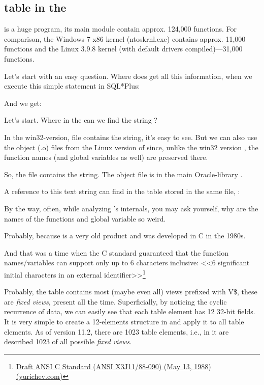 \subsection{ table in the \oracle}

\myindex{\oracle}
 is a huge program, its main module  contain approx. 124,000 functions. For comparison, the Windows 7 x86 kernel (ntoskrnl.exe) contains approx. 11,000 functions and the Linux 3.9.8 kernel
(with default drivers compiled)---31,000 functions.

Let's start with an easy question. Where does \oracle get all this information, when we execute this simple statement in SQL*Plus:



And we get:



Let's start. Where in the \oracle can we find the string ?

In the win32-version,  file contains the string,
it's easy to see.
But we can also use the object (.o) files from the Linux version of \oracle since, unlike the win32 version , the function names (and global variables as well) are preserved there.

So, the  file contains the  string.
The object file is in the main Oracle-library .

A reference to this text string can find in the  table stored in the same file, :



By the way, often, while analyzing \oracle's internals, you may ask yourself, why are the names of the functions and global variable so weird.

Probably, because \oracle is a very old product and was developed in C in the 1980s.

And that was a time when the C standard guaranteed that the function names/variables can support only up to 6 characters inclusive: <<6 significant initial characters in an external identifier>>\footnote{\href{http://go.yurichev.com/17142}{Draft ANSI C Standard (ANSI X3J11/88-090) (May 13, 1988) (yurichev.com)}}

Probably, the table  contains most (maybe even all) views prefixed with V\$, these are \emph{fixed views}, present all the time.
Superficially, by noticing the cyclic recurrence of data, we can easily see that each  table element has 12 32-bit fields.
It is very simple to create a 12-elements structure in \IDA and apply it to all table elements.
As of \oracle version 11.2, there are 1023 table elements, i.e., in it are described 1023 of all possible \emph{fixed views}.

